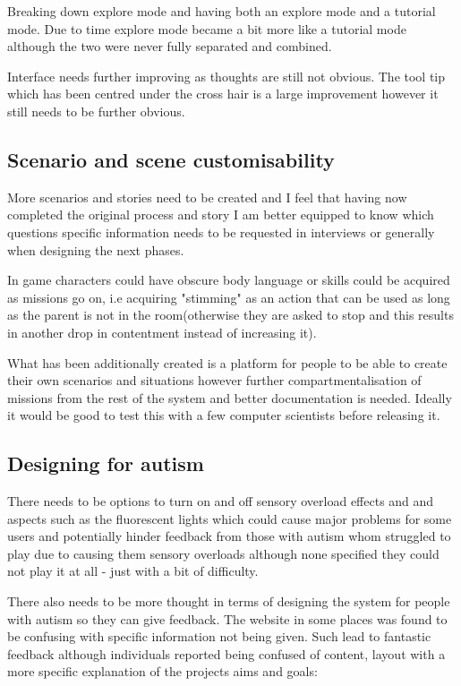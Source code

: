 Breaking down explore mode and having both an explore mode and a tutorial mode. Due to time explore mode became a bit more like a tutorial mode although the two were never fully separated and combined. 

Interface needs further improving as thoughts are still not obvious. The tool tip which has been centred under the cross hair is a large improvement however it still needs to be further obvious. 

\subsection{Scenario and scene customisability}
More scenarios and stories need to be created and I feel that having now completed the original process and story I am better equipped to know which questions specific information needs to be requested in interviews or generally when designing the next phases. 

In game characters could have obscure body language or skills could be acquired as missions go on, i.e acquiring "stimming" as an action that can be used as long as the parent is not in the room(otherwise they are asked to stop and this results in another drop in contentment instead of increasing it).

What has been additionally created is a platform for people to be able to create their own scenarios and situations however further compartmentalisation of missions from the rest of the system and better documentation is needed. Ideally it would be good to test this with a few computer scientists before releasing it.

\subsection{Designing for autism}
There needs to be options to turn on and off sensory overload effects and and aspects such as the fluorescent lights which could cause major problems for some users and  potentially hinder feedback from those with autism whom struggled to play due to causing them sensory overloads although none specified they could not play it at all - just with a bit of difficulty. 

There also needs to be more thought in terms of designing the system for people with autism so they can give feedback. The website in some places was found to be confusing with specific information not being given. Such lead to fantastic feedback although individuals reported being confused of content, layout with a more specific explanation of the projects aims and goals:

